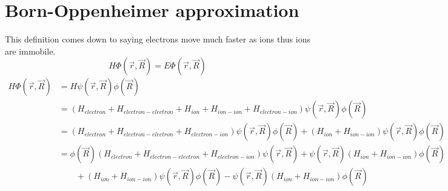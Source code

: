 \section{Born-Oppenheimer approximation}
This definition comes down to saying electrons move much faster as ions thus ions are immobile.
\begin{equation}
	H\Phi(\vec{r}, \vec{R}) = E\Phi(\vec{r}, \vec{R})
\end{equation}
\begin{align}
	H\Phi(\vec{r}, \vec{R}) & = H\psi(\vec{r}, \vec{R})\phi(\vec{R}) \\
	& = (H_{electron} + H_{electron - electron} + H_{ion} + H_{ion - ion} + H_{electron - ion})\psi(\vec{r}, \vec{R})\phi(\vec{R}) \\
	& = (H_{electron} + H_{electron - electron} + H_{electron - ion})\psi(\vec{r}, \vec{R})\phi(\vec{R}) + (H_{ion} + H_{ion - ion})\psi(\vec{r}, \vec{R})\phi(\vec{R}) \\
	& = \phi(\vec{R})(H_{electron} + H_{electron - electron} + H_{electron - ion})\psi(\vec{r}, \vec{R}) + \psi(\vec{r}, \vec{R})(H_{ion} + H_{ion - ion})\phi(\vec{R}) \nonumber \\
	& \qquad + (H_{ion} + H_{ion - ion})\psi(\vec{r}, \vec{R})\phi(\vec{R}) - \psi(\vec{r}, \vec{R})(H_{ion} + H_{ion - ion})\phi(\vec{R})
\end{align}

